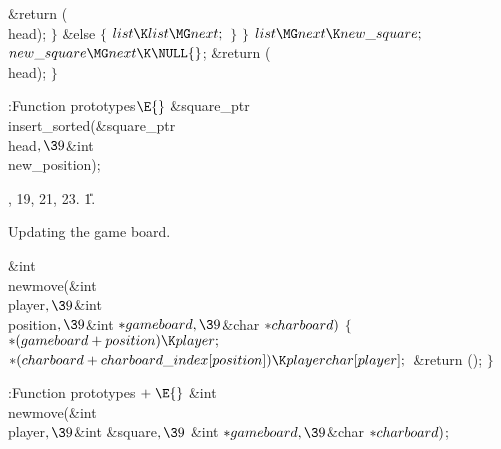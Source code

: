 \&{return} (\\{head});\6
\4${}\}{}$\2\6
\&{else}\5
${}\{{}$\1\6
${}\\{list}\K\\{list}\MG\\{next};{}$\6
\4${}\}{}$\2\6
\4${}\}{}$\2\6
${}\\{list}\MG\\{next}\K\\{new\_square};{}$\6
${}\\{new\_square}\MG\\{next}\K\NULL{}$;\6
\&{return} (\\{head});\6
\4${}\}{}$\2\par
\fi

\B{}:Function prototypes\X${}\E{}$\6
\&{square\_ptr} \\{insert\_sorted}(\&{square\_ptr} \\{head}${},\39{}$\&{int} %
\\{new\_position});\par
{}, 19, 21, 23.
\U1.\fi

Updating the game board.

\Y\B\&{int} \\{newmove}(\&{int} \\{player}${},\39{}$\&{int} \\{position}${},%
\39{}$\&{int} ${}{*}\\{gameboard},\39{}$\&{char} ${}{*}\\{charboard}){}$\1\1\2%
\2\6
${}\{{}$\1\6
${}{*}(\\{gameboard}+\\{position})\K\\{player};{}$\6
${}{*}(\\{charboard}+\\{charboard\_index}[\\{position}])\K\\{playerchar}[%
\\{player}];{}$\6
\&{return} ();\6
\4${}\}{}$\2\par
\fi

\B{}:Function prototypes\X${}\mathrel+\E{}$\6
\&{int} \\{newmove}(\&{int} \\{player}${},\39{}$\&{int} \&{square}${},\39{}$%
\&{int} ${}{*}\\{gameboard},\39{}$\&{char} ${}{*}\\{charboard}){}$;\par
\fi

